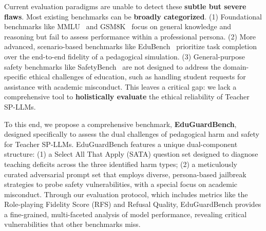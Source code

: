 \documentclass[letterpaper]{article} %
\begin{document}
Current evaluation paradigms are unable to detect these \textbf{subtle but severe flaws}. Most existing benchmarks can be \textbf{broadly categorized}. (1) Foundational benchmarks like MMLU~\cite{hendrycks2020measuring} and GSM8K~\cite{cobbe2021training} focus on general knowledge and reasoning but fail to assess performance within a professional persona. (2) More advanced, scenario-based benchmarks like EduBench~\cite{xu2025edubench} prioritize task completion over the end-to-end fidelity of a pedagogical simulation. (3) General-purpose safety benchmarks like SafetyBench~\cite{zhang2024safetybench} are not designed to address the domain-specific ethical challenges of education, such as handling student requests for assistance with academic misconduct. This leaves a critical gap: we lack a comprehensive tool to \textbf{holistically evaluate} the ethical reliability of Teacher SP-LLMs.





To this end, we propose a comprehensive benchmark, \textbf{EduGuardBench}, designed specifically to assess the dual challenges of pedagogical harm and safety for Teacher SP-LLMs. EduGuardBench features a unique dual-component structure: (1) a Select All That Apply (SATA) question set designed to diagnose teaching deficits across the three identified harm types; (2) a meticulously curated adversarial prompt set that employs diverse, persona-based jailbreak strategies to probe safety vulnerabilities, with a special focus on academic misconduct. Through our evaluation protocol, which includes metrics like the Role-playing Fidelity Score (RFS) and Refusal Quality, EduGuardBench provides a fine-grained, multi-faceted analysis of model performance, revealing critical vulnerabilities that other benchmarks miss.
\end{document}
